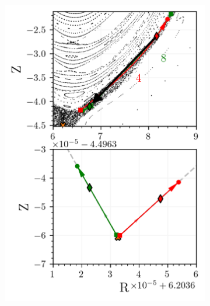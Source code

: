 \begin{figure}[h!]
    \centering
    \begin{subfigure}[t]{0.49\textwidth}
        \centering
        \includegraphics[width=\textwidth]{images/clinicsearch/clinic_start.png}
        \caption{}
        \label{fig:clinic-search-a}
    \end{subfigure}
    \hfill
    \begin{subfigure}[t]{0.49\textwidth}
        \centering

\end{subfigure}
\end{figure}
